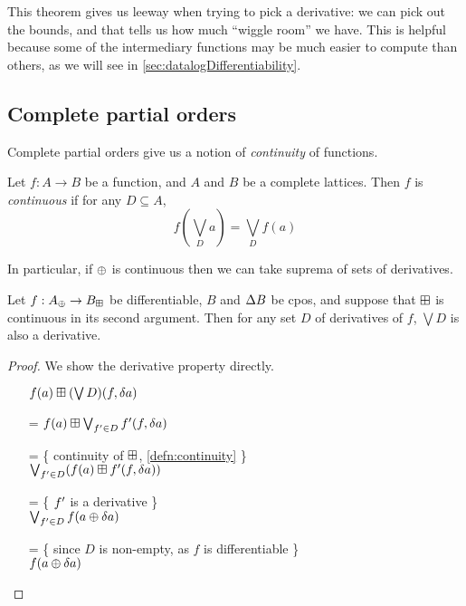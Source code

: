 This theorem gives us leeway when trying to pick a derivative: we can pick out the
bounds, and that tells us how much ``wiggle room'' we have. This is helpful
because some of the intermediary functions may be much easier to compute than
others, as we will see in \cref{sec:datalogDifferentiability}.

\subsection{Complete partial orders}

Complete partial orders give us a notion of \emph{continuity} of functions.

\begin{defn}[Continuity]
\label{defn:continuity}
  Let $f: A \rightarrow B$ be a function, and $A$ and $B$ be a
  complete lattices. Then $f$ is \textit{continuous} if for any $D \subseteq A$,
  $$f(\bigvee_D a) = \bigvee_D f(a)$$
\end{defn}

In particular, if $\oplus$ is continuous then we can take suprema of sets of derivatives.

\begin{prop}
\label{prop:supDerivatives}
  Let $f: A_\oplus \rightarrow B_\boxplus$ be differentiable, $B$ and
  $\Delta B$ be cpos, and suppose that $\boxplus$ is continuous
  in its second argument. Then for any set $D$ of derivatives of $f$, $\bigvee
  D$ is also a derivative.
\end{prop}
\begin{proof}
  We show the derivative property directly.
  \begin{itemize}
    \item[ ]$f(a) \boxplus (\bigvee D)(f, \delta a)$
    \item[=]$f(a) \boxplus \bigvee_{f' \in D} f'(f, \delta a)$
    \item[=]\{ continuity of $\boxplus$, \cref{defn:continuity} \}\\
      $\bigvee_{f' \in D} (f(a) \boxplus f'(f, \delta a))$
    \item[=]\{ $f'$ is a derivative \}\\
      $\bigvee_{f' \in D} f(a \oplus \delta a)$
    \item[=]\{ since $D$ is non-empty, as $f$ is differentiable \}\\
      $f(a \oplus \delta a)$
  \end{itemize}
\end{proof}

